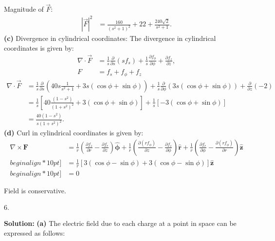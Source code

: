 \documentclass{article}
\begin{document}
Magnitude of $\vec{F}$:
\begin{align*}
|\vec{F}|^2 &= 
    \frac{160}{(s^2+1)^2} 
    + 22 
    + \frac{240\sqrt{2}}{s^2+1}.
\end{align*}
\textbf{(c)} Divergence in cylindrical coordinates:
The divergence in cylindrical coordinates is given by:
\begin{align*}
\nabla \cdot \vec{F} &= 
    \frac{1}{s} 
    \frac{\partial}{\partial s}(s f_s) 
    + 
    \frac{1}{s} 
    \frac{\partial f_\phi}{\partial \phi} 
    + 
    \frac{\partial f_z}{\partial z},
\\
F &= 
        f_s
        + f_{\phi} + f_z
\end{align*}
\begin{align*}
\nabla \cdot\vec{F}&= 
\frac{1}{s} \frac{\partial}{\partial s} 
\left( 
40s \frac{1}{s^2+1} + 3s (\cos\phi + \sin\phi) 
\right) 
+ \frac{1}{s} \frac{\partial}{\partial \phi} 
\left( 
3s (\cos\phi + \sin\phi) 
\right) 
+ \frac{\partial}{\partial z} (-2) \\
&= \frac{1}{s} 
\left[ 
40 \frac{\left( 1 - s^2 \right)}{ 
\left( 1 + s^2 \right)^2 }
+ 3 (\cos\phi + \sin\phi)
\right] 
+ \frac{1}{s} 
\left[ -3    (\cos\phi + \sin\phi) 
\right] \\
&= \frac{40 (1 - s^2)}{s (1 + s^2)^2}.
\end{align*}
\textbf{(d)} Curl in cylindrical coordinates is given by:
\begin{align*}
\nabla \times \mathbf{F} &= \frac{1}{r} \left( \frac{\partial f_z}{\partial r} - \frac{\partial f_r}{\partial z} \right) \hat{\boldsymbol{\phi}} 
+ \frac{1}{r} \left( \frac{\partial (r f_\phi)}{\partial z} - \frac{\partial f_z}{\partial \phi} \right) \hat{\mathbf{r}} 
+ \frac{1}{r} \left( \frac{\partial f_r}{\partial \phi} - \frac{\partial (r f_\phi)}{\partial r} \right) \hat{\mathbf{z}} \\begin{align*}10pt]
&= \frac{1}{r} [3 (\cos\phi - \sin\phi) + 3 (\cos\phi - \sin\phi)] \hat{\mathbf{z}} \\begin{align*}10pt]
&= 0
\end{align*}

Field is conservative.\newline \newline


6. \newline

\textbf{Solution:}\newline
\textbf{(a)} The electric field due to each charge at a point in space can be expressed as follows:
\end{document}
